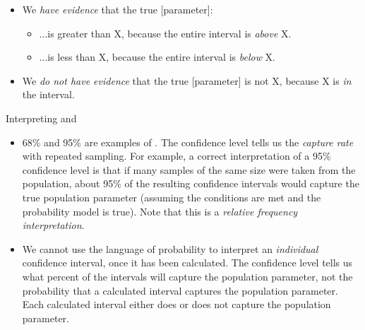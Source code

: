 \begin{itemize}
\begin{itemize}\vspace{-1mm}
\setlength{\itemsep}{0mm}
\item We \emph{have evidence} that the true [parameter]:
\begin{itemize}\vspace{-1mm}
\setlength{\itemsep}{0mm}
\item[]  ...is greater than X, because the entire interval is \emph{above} X.
\item[] ...is less than X, because the entire interval is \emph{below} X.
\end{itemize}
\item We \emph{do not have evidence} that the true [parameter] is not  X, because X is \emph{in} the interval.
\end{itemize}

\end{itemize}
Interpreting  and 
\begin{itemize}
\item 68\% and 95\% are examples of .  The confidence level tells us the \emph{capture rate} with repeated sampling.  For example, a correct interpretation of a 95\% confidence level is that if many samples of the same size were taken from the population, about 95\% of the resulting confidence intervals would capture the true population parameter (assuming the conditions are met and the probability model is true).  Note that this is a \emph{relative frequency interpretation}.  

\item We cannot use the language of probability to interpret an \emph{individual} confidence interval, once it has been calculated.  The confidence level tells us what percent of the intervals will capture the population parameter, not the probability that a calculated interval captures the population parameter.  Each calculated interval either does or does not capture the population parameter.  
\end{itemize}


